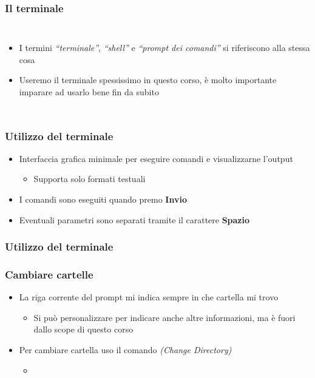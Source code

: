 \begin{contentframe}
    \frametitle{Il terminale}

    \begin{columns}
        \begin{itemize}
            \item I termini \textit{``terminale''}, \textit{``shell''} e \textit{``prompt dei comandi''} si riferiscono alla stessa cosa

            \bigskip
            \item Useremo il terminale spessissimo in questo corso, è molto importante imparare ad usarlo bene fin da subito
        \end{itemize}

        \centering
    \end{columns}
\end{contentframe}

\begin{contentframe}
    \frametitle{Utilizzo del terminale}

    \begin{itemize}
        \item Interfaccia grafica minimale per eseguire comandi e visualizzarne l'output
        \begin{itemize}
            \item Supporta solo formati testuali
        \end{itemize}

        \bigskip
        \item I comandi sono eseguiti quando premo \textbf{Invio}
        \item Eventuali parametri sono separati tramite il carattere \textbf{Spazio}
    \end{itemize}
\end{contentframe}

\begin{contentframe}
    \frametitle{Utilizzo del terminale}
    \frametitle{Cambiare cartelle}

    \begin{itemize}
        \item La riga corrente del prompt mi indica sempre in che cartella mi trovo
        \begin{itemize}
            \item Si può personalizzare per indicare anche altre informazioni, ma è fuori dallo scope di questo corso 
        \end{itemize}
        
        \bigskip
        \item Per cambiare cartella uso il comando  \textit{(Change Directory)}
        \begin{itemize}
            \item {}
            
        \end{itemize}
    \end{itemize}
\end{contentframe}


